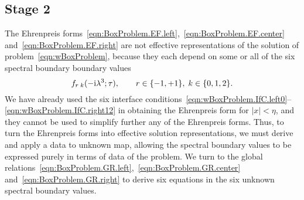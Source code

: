 \documentclass[11pt,reqno,oneside,a4paper]{article}
\begin{document}
\subsection{Stage 2}

The Ehrenpreis forms~\eqref{eqn:BoxProblem.EF.left},~\eqref{eqn:BoxProblem.EF.center} and~\eqref{eqn:BoxProblem.EF.right} are not effective representations of the solution of problem~\ref{eqn:wBoxProblem}, because they each depend on some or all of the six spectral boundary boundary values
$$
    f_{r\; k}(-\mathrm{i}\lambda^3;\tau), \qquad r\in\{-1,+1\},\;k\in\{0,1,2\}.
$$
We have already used the six interface conditions~\eqref{eqn:wBoxProblem.IfC.left0}--\eqref{eqn:wBoxProblem.IfC.right12} in obtaining the Ehrenpreis form for $\lvert x \rvert < \eta$, and they cannot be used to simplify further any of the Ehrenpreis forms.
Thus, to turn the Ehrenpreis forms into effective solution representations, we must derive and apply a data to unknown map, allowing the spectral boundary values to be expressed purely in terms of data of the problem.
We turn to the global relations~\eqref{eqn:BoxProblem.GR.left},~\eqref{eqn:BoxProblem.GR.center} and~\eqref{eqn:BoxProblem.GR.right} to derive six equations in the six unknown spectral boundary values.
\end{document}
